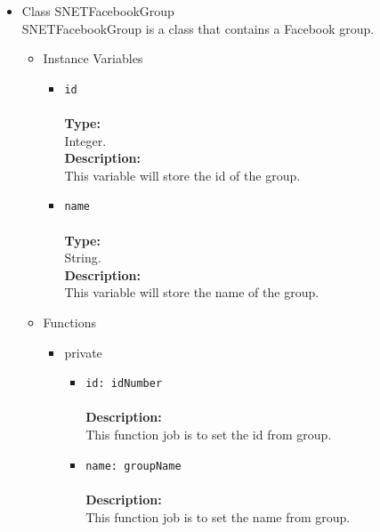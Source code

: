 \begin{itemize}
\begin{itemize}
\begin{itemize}
\end{itemize} %
\end{itemize} %

\item Class SNETFacebookGroup\\
\label{sec-1-4-2-10}%
SNETFacebookGroup is a class that contains a Facebook group.
   
\begin{itemize}

\item Instance Variables
\label{sec-1-4-2-10-1}%
\begin{itemize}
\item \verb~id~\\\\
\textbf{Type:}\\
     Integer.\\

     \textbf{Description:}\\
     This variable will store the id of the group.\\
\item \verb~name~\\\\
\textbf{Type:}\\
     String.\\

     \textbf{Description:}\\
     This variable will store the name of the group.
\end{itemize}


\item Functions
\label{sec-1-4-2-10-2}%
\begin{itemize}

\item private
\label{sec-1-4-2-10-2-1}%
\begin{itemize}
\item \verb~id: idNumber~\\\\
\textbf{Description:}\\
      This function job is to set the id from group.\\
\item \verb~name: groupName~\\\\
\textbf{Description:}\\
      This function job is to set the name from group.
\end{itemize}



\end{itemize}
\end{itemize}
\end{itemize}
